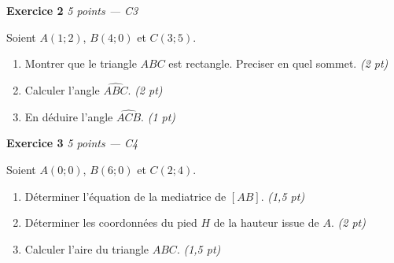 \bigskip

\textbf{Exercice 2} \hfill \textit{5 points — C3}

Soient $A(1; 2)$, $B(4; 0)$ et $C(3; 5)$.

\begin{enumerate}
  \item Montrer que le triangle $ABC$ est rectangle. Preciser en quel sommet. \hfill \textit{(2 pt)}
  \item Calculer l'angle $\widehat{ABC}$. \hfill \textit{(2 pt)}
  \item En déduire l'angle $\widehat{ACB}$. \hfill \textit{(1 pt)}
\end{enumerate}


\bigskip

\textbf{Exercice 3} \hfill \textit{5 points — C4}

Soient $A(0; 0)$, $B(6; 0)$ et $C(2; 4)$.

\begin{enumerate}
  \item Déterminer l'équation de la mediatrice de $[AB]$. \hfill \textit{(1,5 pt)}
  \item Déterminer les coordonnées du pied $H$ de la hauteur issue de $A$. \hfill \textit{(2 pt)}
  \item Calculer l'aire du triangle $ABC$. \hfill \textit{(1,5 pt)}
\end{enumerate}



